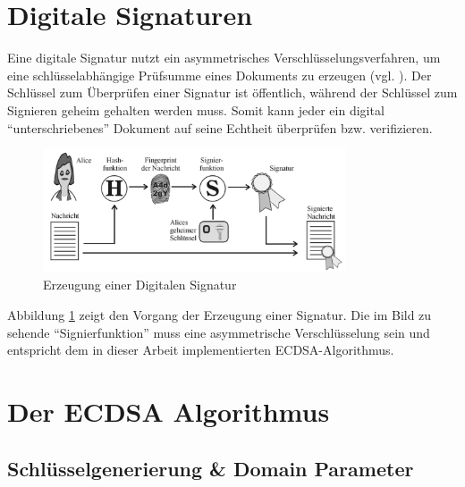 \section{Digitale Signaturen} \label{sec:digsig}

Eine digitale Signatur nutzt ein asymmetrisches Verschlüsselungsverfahren, um eine schlüsselabhängige Prüfsumme eines Dokuments zu erzeugen (vgl. \cite{wolf}). Der Schlüssel zum Überprüfen einer Signatur ist öffentlich, während der Schlüssel zum Signieren geheim gehalten werden muss. Somit kann jeder ein digital ``unterschriebenes'' Dokument auf seine Echtheit überprüfen bzw. verifizieren.

\begin{figure}[H]
	\centering
   \includegraphics[width=0.80\textwidth]{bilder/digisig}
	\caption{Erzeugung einer Digitalen Signatur}
	\label{fig:digisig}
\end{figure}

Abbildung \ref{fig:digisig} zeigt den Vorgang der Erzeugung einer Signatur. Die im Bild zu sehende ``Signierfunktion'' muss eine asymmetrische Verschlüsselung sein und entspricht dem in dieser Arbeit implementierten ECDSA-Algorithmus.

\section{Der ECDSA Algorithmus}
\label{ecdsa-algo}

\subsection{Schlüsselgenerierung \& Domain Parameter}

